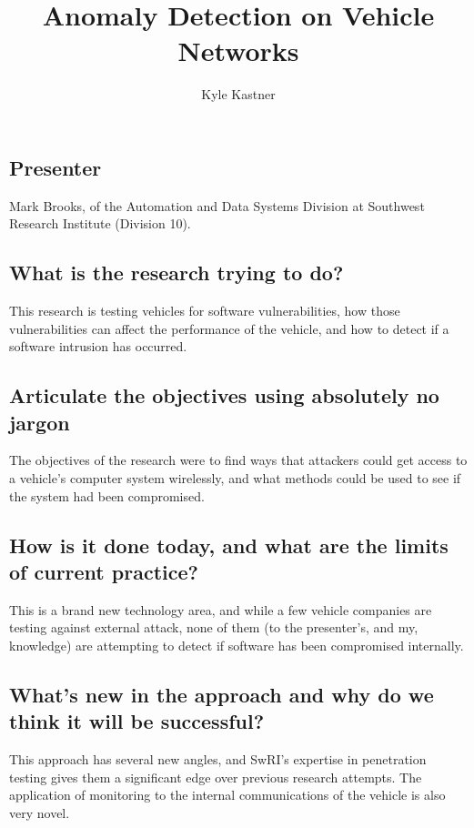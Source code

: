 \documentclass[9pt]{article}
\begin{document}
\title{Anomaly Detection on Vehicle Networks}
\author{Kyle Kastner}

\maketitle

\subsection*{Presenter}
Mark Brooks, of the Automation and Data Systems Division at Southwest Research Institute (Division 10).
\subsection*{What is the research trying to do?}
This research is testing vehicles for software vulnerabilities, how those vulnerabilities can affect the performance
of the vehicle, and how to detect if a software intrusion has occurred.
\subsection*{Articulate the objectives using absolutely no jargon}
The objectives of the research were to find ways that attackers could get access to a vehicle's computer system
wirelessly, and what methods could be used to see if the system had been compromised. 
\subsection*{How is it done today, and what are the limits of current practice?}
This is a brand new technology area, and while a few vehicle companies are testing against external attack, none of them (to the
presenter's, and my, knowledge) are attempting to detect if software has been compromised internally.
\subsection*{What's new in the approach and why do we think it will be successful?}
This approach has several new angles, and SwRI's expertise in penetration testing gives them a significant edge over previous 
research attempts. The application of monitoring to the internal communications of the vehicle is also very novel.
\end{document}
